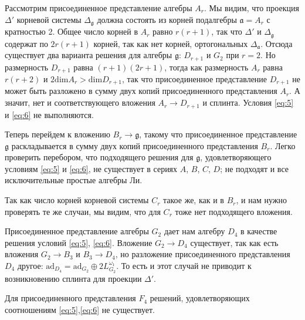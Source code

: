 \documentclass[12pt]{article}
\newcommand{\gf}{\mathfrak{g}}
\newcommand{\af}{\mathfrak{a}}
\begin{document}

Рассмотрим присоединенное представление алгебры $A_{r}$. Мы видим, что проекция $\Delta'$ корневой
системы $\Delta_{\gf}$ должна состоять из корней подалгебры $\af=A_{r}$ с кратностью 2. Общее число
корней в $A_{r}$ равно $r(r+1)$, так что $\Delta'$ и $\Delta_{\gf}$ содержат по $2r(r+1)$ корней,
так как нет корней, ортогональных $\Delta_{\af}$. Отсюда существует два варианта решения для алгебры
$\gf$: $D_{r+1}$ и $G_{2}$ при $r=2$. Но размерность $D_{r+1}$ равна $(r+1)(2r+1)$, тогда как
размерность $A_{r}$ равна $r(r+2)$ и $2\mathrm{dim}A_{r}>\mathrm{dim}D_{r+1}$, так что
присоединенное представление $D_{r+1}$ не может быть разложено в сумму двух копий присоединенного
представления $A_{r}$. А значит, нет и соответствующего вложения $A_{r}\to D_{r+1}$ и сплинта.
Условия \ref{eq:5} и \ref{eq:6} не выполняются.

Теперь перейдем к вложению $B_{r}\to \gf$, такому что присоединенное представление $\gf$
раскладывается в сумму двух копий присоединенного представления $B_{r}$. Легко проверить перебором,
что подходящего решения для $\gf$, удовлетворяющего условиям \ref{eq:5} и \ref{eq:6}, не существует в
сериях $A$, $B$, $C$, $D$; не подходят и все исключительные простые алгебры Ли.

Так как число корней корневой системы  $C_{r}$ такое же, как и в $B_{r}$, и нам нужно проверять те же
случаи, мы видим, что для $C_{r}$ тоже нет подходящего вложения.

Присоединенное представление алгебры $G_{2}$ дает нам алгебру  $D_{4}$ в качестве решения условий
\ref{eq:5}, \ref{eq:6}. Вложение  $G_{2}\to D_{4}$ существует, так как есть вложения $G_{2}\to B_{3}$
и $B_{3}\to D_{4}$, но разложение присоединенного представления $D_{4}$ другое: $
\mathrm{ad}_{D_{4}}=\mathrm{ad}_{G_{2}}\oplus 2 L^{\omega_{1}}_{G_{2}}$. То есть и этот случай не
приводит к возникновению сплинта для проекции $\Delta'$. 

Для присоединенного представления  $F_{4}$ решений, удовлетворяющих соотношениям
\ref{eq:5},\ref{eq:6} не существует.
\end{document}

